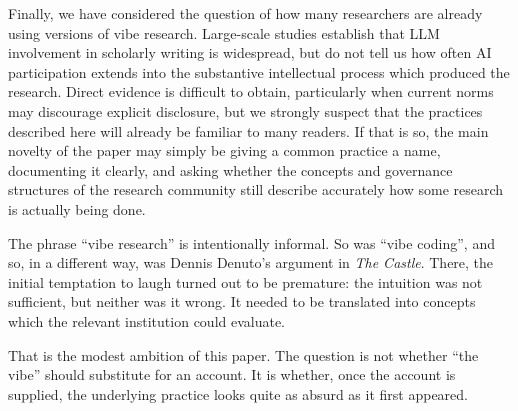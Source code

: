 \documentclass[12pt]{article}
\begin{document}
Finally, we have considered the question of how many researchers are already using versions of vibe research. Large-scale studies establish that LLM involvement in scholarly writing is widespread, but do not tell us how often AI participation extends into the substantive intellectual process which produced the research. Direct evidence is difficult to obtain, particularly when current norms may discourage explicit disclosure,
but we strongly suspect that the practices described here will already be familiar to many readers.
If that is so, the main novelty of the paper may simply be giving a common practice a name, documenting it clearly, and asking whether the concepts and governance structures of the research community still describe accurately how some research is actually being done.

The phrase ``vibe research'' is intentionally informal. So was ``vibe coding'', and so, in a different way, was Dennis Denuto's argument in \emph{The Castle}. There, the initial temptation to laugh turned out to be premature: the intuition was not sufficient, but neither was it wrong. It needed to be translated into concepts which the relevant institution could evaluate.

That is the modest ambition of this paper. The question is not whether ``the vibe'' should substitute for an account. It is whether, once the account is supplied, the underlying practice looks quite as absurd as it first appeared.

{}


\end{document}
